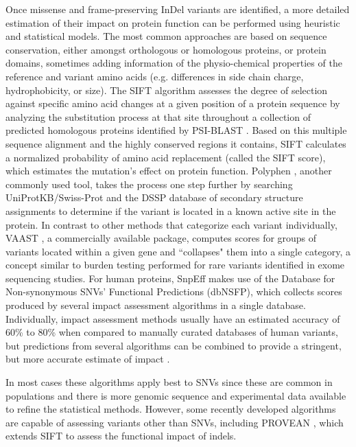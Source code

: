 Once missense and frame-preserving InDel variants are identified, a more detailed estimation of their impact on protein function can be performed using heuristic and statistical models. The most common approaches are based on sequence conservation, either amongst orthologous or homologous proteins, or protein domains, sometimes adding information of the physio-chemical properties of the reference and variant amino acids (e.g. differences in side chain charge, hydrophobicity, or size). The SIFT algorithm \cite{kumar2009predicting} assesses the degree of selection against specific amino acid changes at a given position of a protein sequence by analyzing the substitution process at that site throughout a collection of predicted homologous proteins identified by PSI-BLAST \cite{altschul1997gapped}. Based on this multiple sequence alignment and the highly conserved regions it contains, SIFT calculates a normalized probability of amino acid replacement (called the SIFT score), which estimates the mutation's effect on protein function. Polyphen \cite{adzhubei2010method}, another commonly used tool, takes the process one step further by searching UniProtKB/Swiss-Prot \cite{uniprot2013update} and the DSSP database of secondary structure assignments \cite{joosten2011series} to determine if the variant is located in a known active site in the protein. In contrast to other methods that categorize each variant individually, VAAST \cite{rope2011using}, a commercially available package, computes scores for groups of variants located within a given gene and ``collapses" them into a single category, a concept similar to burden testing performed for rare variants identified in exome sequencing studies. For human proteins, SnpEff makes use of the Database for Non-synonymous SNVs' Functional Predictions \cite{liu2011dbnsfp} (dbNSFP), which collects scores produced by several impact assessment algorithms in a single database. Individually, impact assessment methods usually have an estimated accuracy of 60\% to 80\% when compared to manually curated databases of human variants, but predictions from several algorithms can be combined to provide a stringent, but more accurate estimate of impact \cite{choi2012predicting}.

In most cases these algorithms apply best to SNVs since these are common in populations and there is more genomic sequence and experimental data available to refine the statistical methods. 
However, some recently developed algorithms are capable of assessing variants other than SNVs, including PROVEAN \cite{choi2012predicting}, which extends SIFT to assess the functional impact of indels.

